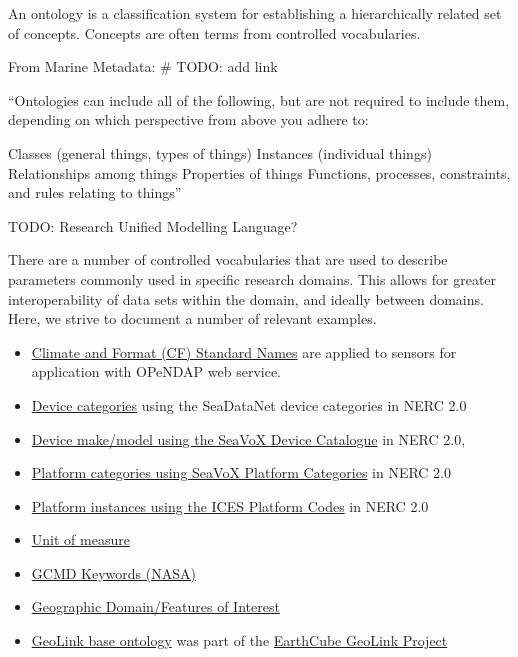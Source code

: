 \documentclass[
]{book}
\begin{document}
An ontology is a classification system for establishing a hierarchically related set of concepts. Concepts are often terms from controlled vocabularies.

From Marine Metadata: \# TODO: add link

``Ontologies can include all of the following, but are not required to include them, depending on which perspective from above you adhere to:

Classes (general things, types of things)
Instances (individual things)
Relationships among things
Properties of things
Functions, processes, constraints, and rules relating to things''

TODO: Research Unified Modelling Language?

There are a number of controlled vocabularies that are used to describe parameters commonly used in specific research domains. This allows for greater interoperability of data sets within the domain, and ideally between domains. Here, we strive to document a number of relevant examples.

\begin{itemize}
\item
  \href{http://cfconventions.org/standard-names.html}{Climate and Format (CF) Standard Names} are applied to sensors for application with OPeNDAP web service.
\item
  \href{http://vocab.nerc.ac.uk/collection/L05/current/}{Device categories} using the SeaDataNet device categories in NERC 2.0
\item
  \href{http://vocab.nerc.ac.uk/collection/L22/current/}{Device make/model using the SeaVoX Device Catalogue} in NERC 2.0,
\item
  \href{http://vocab.nerc.ac.uk/collection/L06/current/}{Platform categories using SeaVoX Platform Categories} in NERC 2.0
\item
  \href{http://vocab.nerc.ac.uk/collection/C17/current/}{Platform instances using the ICES Platform Codes} in NERC 2.0
\item
  \href{http://vocab.nerc.ac.uk/collection/P06/current/}{Unit of measure}
\item
  \href{http://vocab.nerc.ac.uk/collection/P04/current/}{GCMD Keywords (NASA)}
\item
  \href{http://vocab.nerc.ac.uk/collection/C19/current/}{Geographic Domain/Features of Interest}
\item
  \href{http://schema.geolink.org/1.0/base/main.html}{GeoLink base ontology} was part of the \href{http://www.geolink.org/}{EarthCube GeoLink Project}
\end{itemize}
\end{document}
